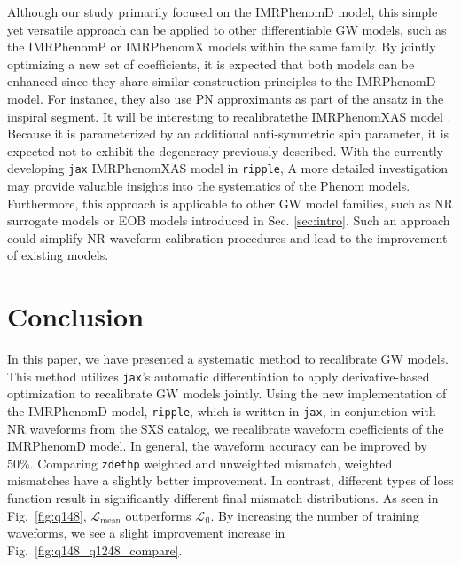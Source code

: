 \documentclass[twocolumn]{aastex631}
\newcommand{\ripple}{\texttt{ripple}}
\newcommand{\jax}{\texttt{jax}}
\newcommand{\zdethp}{\texttt{zdethp}}
\begin{document}
Although our study primarily focused on the IMRPhenomD model, this simple yet
versatile approach can be applied to other differentiable GW models, such as the
IMRPhenomP \citep{hannam2014simple, khan2019phenomenological} or IMRPhenomX \citep{pratten2020setting,pratten2021computationally} 
models within the same family. By jointly optimizing a new set of coefficients,
it is expected that both models can be enhanced since they share similar
construction principles to the IMRPhenomD model. For instance, they also use PN
approximants as part of the ansatz in the inspiral segment. It will be interesting 
to recalibratethe IMRPhenomXAS model \citep{pratten2020setting}. Because it is
parameterized by an additional anti-symmetric spin parameter, it is expected not
to exhibit the degeneracy previously described. With the currently developing 
{\jax} IMRPhenomXAS model in {\ripple}, A more detailed investigation
may provide valuable insights into the systematics of the Phenom models.
Furthermore, this approach is applicable to other GW model families, such as NR
surrogate models or EOB models introduced in Sec. \ref{sec:intro}. Such an approach could 
simplify NR waveform calibration procedures and lead to the improvement of 
existing models.


\section{Conclusion} \label{sec:conclusion}

In this paper, we have presented a systematic method to recalibrate GW models.
This method utilizes {\jax}'s automatic differentiation to apply
derivative-based optimization to recalibrate GW models jointly. Using the new
implementation of the IMRPhenomD model, {\ripple}, which is written in \jax, in
conjunction with NR waveforms from the SXS catalog, we recalibrate waveform
coefficients of the IMRPhenomD model. In general, the waveform accuracy can be
improved by 50\%. Comparing {\zdethp} weighted and unweighted mismatch, weighted
mismatches have a slightly better improvement. In contrast, different types of
loss function result in significantly different final mismatch distributions. As 
seen in Fig.~\ref{fig:q148}, $\mathcal{L}_{\mathrm{mean}}$ outperforms 
$\mathcal{L}_{\mathrm{fl}}$. By increasing the number of training waveforms, we see a 
slight improvement increase in Fig.~\ref{fig:q148_q1248_compare}. 
\end{document}
